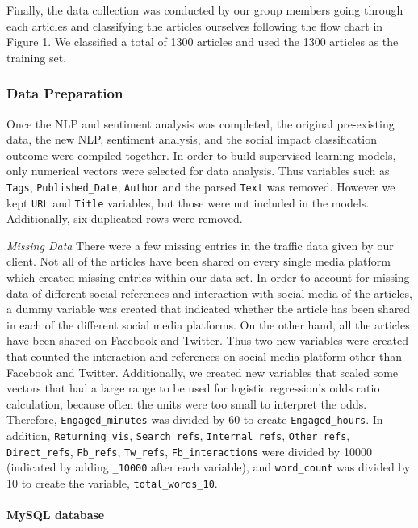 \documentclass[10pt,letterpaper]{article}
\begin{document}
Finally, the data collection was conducted by our group members going
through each articles and classifying the articles ourselves following
the flow chart in Figure 1. We classified a total of 1300 articles and
used the 1300 articles as the training set.

\subsubsection{Data Preparation}\label{data-preparation}

Once the NLP and sentiment analysis was completed, the original
pre-existing data, the new NLP, sentiment analysis, and the social
impact classification outcome were compiled together. In order to build
supervised learning models, only numerical vectors were selected for
data analysis. Thus variables such as \texttt{Tags},
\texttt{Published\_Date}, \texttt{Author} and the parsed \texttt{Text}
was removed. However we kept \texttt{URL} and \texttt{Title} variables,
but those were not included in the models. Additionally, six duplicated
rows were removed.

\emph{Missing Data} There were a few missing entries in the traffic data
given by our client. Not all of the articles have been shared on every
single media platform which created missing entries within our data set.
In order to account for missing data of different social references and
interaction with social media of the articles, a dummy variable was
created that indicated whether the article has been shared in each of
the different social media platforms. On the other hand, all the
articles have been shared on Facebook and Twitter. Thus two new
variables were created that counted the interaction and references on
social media platform other than Facebook and Twitter. Additionally, we
created new variables that scaled some vectors that had a large range to
be used for logistic regression's odds ratio calculation, because often
the units were too small to interpret the odds. Therefore,
\texttt{Engaged\_minutes} was divided by 60 to create
\texttt{Engaged\_hours}. In addition, \texttt{Returning\_vis},
\texttt{Search\_refs}, \texttt{Internal\_refs}, \texttt{Other\_refs},
\texttt{Direct\_refs}, \texttt{Fb\_refs}, \texttt{Tw\_refs},
\texttt{Fb\_interactions} were divided by 10000 (indicated by adding
\texttt{\_10000} after each variable), and \texttt{word\_count} was
divided by 10 to create the variable, \texttt{total\_words\_10}.

\paragraph{MySQL database}\label{mysql-database}
\end{document}
